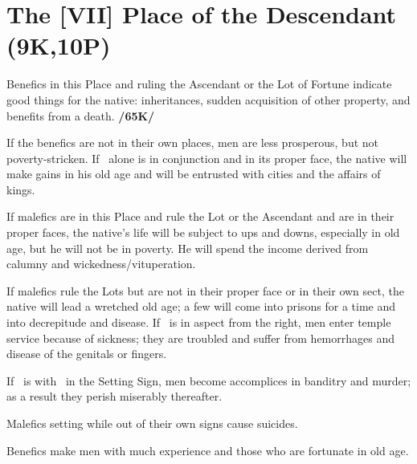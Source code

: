 \section{The [VII] Place of the Descendant (9K,10P)}
Benefics in this Place and ruling the Ascendant or the Lot of Fortune indicate good things for the native: inheritances, sudden acquisition of other property, and benefits from a death. \textbf{/65K/} 

If the benefics are not in their own places, men are less prosperous, but not poverty-stricken. If \Mercury\, alone is in conjunction and in its proper face, the native will make gains in his old age and will be entrusted with cities and the affairs of kings. 

If malefics are in this Place and rule the Lot or the Ascendant and are in their proper faces, the native’s life will be subject to ups and downs, especially in old age, but he will not be in poverty. He will spend the income derived from calumny and wickedness/vituperation. 

If malefics rule the Lots but are not in their proper face or in their own sect, the native will lead a wretched old age; a few will come into prisons for a time and into decrepitude and disease. If \Jupiter\, is in aspect from the right, men enter temple service because of sickness; they are troubled and suffer from hemorrhages and disease of the genitals or fingers. 

If \Mercury\, is with \Mars\, in the Setting Sign, men become accomplices in banditry and murder; as a result they perish miserably thereafter. 

Malefics setting while out of their own signs cause suicides.

Benefics make men with much experience and those who are fortunate in old age.

\newpage